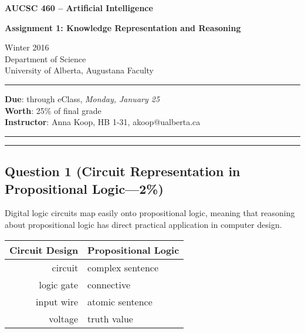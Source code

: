 \documentclass[12pt]{article}
\begin{document}
\noindent
{\Large\bf AUCSC 460 -- Artificial Intelligence}

\vspace*{1\baselineskip}

\noindent
{\large\bf Assignment 1: Knowledge Representation and Reasoning}

\vspace*{1\baselineskip}

\noindent
Winter 2016\\
Department of Science\\
University of Alberta, Augustana Faculty

\vspace*{1.75\baselineskip}
\hrule

\vspace*{0.75\baselineskip}

\noindent
{\bf Due}: through eClass, {\em Monday, January 25}\\
{\bf Worth}: 25\% of final grade
\\
{\bf Instructor}: Anna Koop, HB 1-31, akoop@ualberta.ca

\vspace*{0.75\baselineskip}

\hrule




\vspace*{1\baselineskip}

\hrule


\subsection*{Question 1 \rm(Circuit Representation in Propositional Logic---2\%)}
Digital logic circuits map easily onto propositional logic, meaning that reasoning about propositional logic has direct practical application in computer design.
\begin{center}
\begin{tabular}[h]{r | l}
Circuit Design & Propositional Logic \\
\hline
circuit & complex sentence\\
logic gate & connective \\
input wire & atomic sentence \\
voltage & truth value
\end{tabular}
\end{center}
\end{document}
